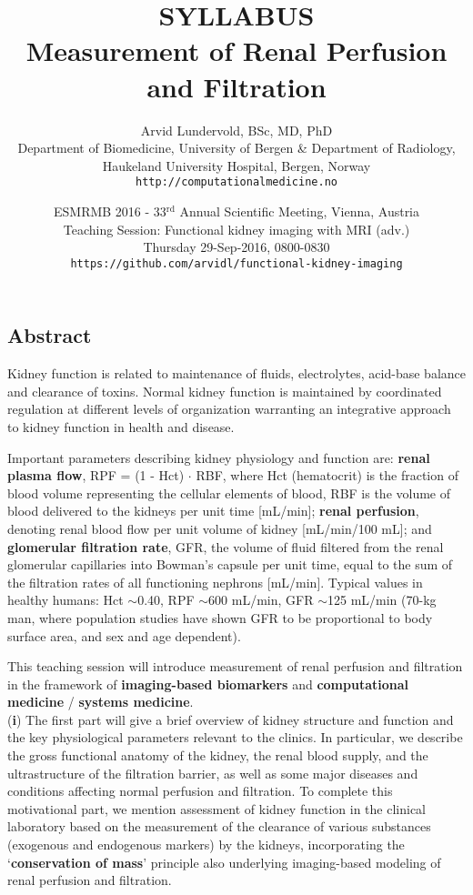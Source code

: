 \documentclass[11pt]{article}
\title{{\small SYLLABUS} \\Measurement of Renal Perfusion and Filtration \vspace{-3mm}}
\author{Arvid Lundervold, {\small BSc, MD, PhD} \\ {\small Department of Biomedicine, University of Bergen \& Department of Radiology, Haukeland University Hospital, Bergen, Norway} \\ {\vspace{-2mm}\footnotesize \tt http://computationalmedicine.no}}
\date{ESMRMB 2016 - 33$^{\mbox{rd}}$ Annual Scientific Meeting,
Vienna, Austria\\ Teaching Session: Functional kidney imaging with MRI (adv.) \\ {\small Thursday 29-Sep-2016, 0800-0830}\\{\footnotesize \tt https://github.com/arvidl/functional-kidney-imaging}}
\begin{document}
\maketitle

\subsection*{Abstract}

Kidney function is related to maintenance of fluids, electrolytes, acid-base balance and clearance of toxins. Normal kidney function is maintained by 
coordinated regulation at different levels of organization warranting an integrative approach to kidney function in health and disease.

Important parameters describing kidney physiology and function are: {\bf renal plasma flow}, RPF = (1 - Hct) $\cdot$ RBF, where Hct (hematocrit) is the fraction 
of blood volume representing the cellular elements of blood, RBF is the volume of blood delivered to the kidneys per unit time [mL/min]; {\bf renal perfusion}, 
denoting renal blood flow per unit volume of kidney [mL/min/100 mL]; and {\bf glomerular filtration rate}, GFR, the volume of fluid filtered from the renal 
glomerular capillaries into Bowman's capsule per unit time, equal to the sum of the filtration rates of all functioning nephrons [mL/min]. Typical values in 
healthy humans: Hct $\sim$0.40, RPF $\sim$600 mL/min, GFR $\sim$125 mL/min (70-kg man, where population studies have shown GFR to be proportional to body 
surface area, and sex and age dependent).

This teaching session will introduce measurement of renal perfusion and filtration in the framework of {\bf imaging-based biomarkers} 
and {\bf computational medicine} / {\bf systems medicine}.\\

\noindent ({\bf i}) The first part will give a brief overview of kidney structure and function and the key physiological parameters relevant to the clinics. 
In particular, we describe the gross functional anatomy of the kidney, the renal blood supply, and the ultrastructure of the filtration barrier, as well 
as some major diseases and conditions affecting normal perfusion and filtration. To complete this motivational part, we mention assessment 
of kidney function in the clinical laboratory based on the measurement of the clearance of various substances (exogenous and endogenous markers) 
by the kidneys, incorporating the `{\bf conservation of mass}' principle also underlying imaging-based modeling of renal perfusion and filtration.\\
\end{document}
